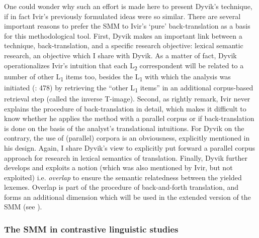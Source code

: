 One could wonder why such an effort is made here to present Dyvik’s technique, if in fact Ivir’s previously formulated ideas were so similar. There are several important reasons to prefer the SMM to Ivir’s ‘pure’ back-translation as a basis for this methodological tool. First, Dyvik makes an important link between a technique, back-translation, and a specific research objective: lexical semantic research, an objective which I share with Dyvik. As a matter of fact, Dyvik operationalizes Ivir’s intuition that each L\textsubscript{2} correspondent will be related to a number of other L\textsubscript{1} items too, besides the L\textsubscript{1} with which the analysis was initiated (\citealt{dirven_functionalism_1987}: 478) by retrieving the “other L\textsubscript{1} items” in an additional corpus-based retrieval step (called the inverse T-image). Second, as \citet[25]{ebeling_patterns_2013} rightly remark, Ivir never explains the procedure of back-translation in detail, which makes it difficult to know whether he applies the method with a parallel corpus or if back-translation is done on the basis of the analyst’s translational intuitions. For Dyvik on the contrary, the use of (parallel) corpora is an obviousness, explicitly mentioned in his design. Again, I share Dyvik’s view to explicitly put forward a parallel corpus approach for research in lexical semantics of translation. Finally, Dyvik further develops and exploits a notion (which was also mentioned by Ivir, but not exploited) i.e. \textit{overlap} to ensure the semantic relatedness between the yielded lexemes. Overlap is part of the procedure of back-and-forth translation, and forms an additional dimension which will be used in the extended version of the SMM (see ).


\subsubsection{\label{sec:2.3.4.4}  The SMM in contrastive linguistic studies}


